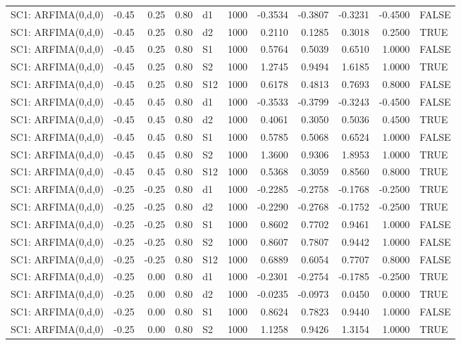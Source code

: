 \begin{table}[ht]
\begin{tabular}{lrrrlrrrrrl}
  SC1: ARFIMA(0,d,0) & -0.45 & 0.25 & 0.80 & d1 & 1000 & -0.3534 & -0.3807 & -0.3231 & -0.4500 & FALSE \\ 
  SC1: ARFIMA(0,d,0) & -0.45 & 0.25 & 0.80 & d2 & 1000 & 0.2110 & 0.1285 & 0.3018 & 0.2500 & TRUE \\ 
  SC1: ARFIMA(0,d,0) & -0.45 & 0.25 & 0.80 & S1 & 1000 & 0.5764 & 0.5039 & 0.6510 & 1.0000 & FALSE \\ 
  SC1: ARFIMA(0,d,0) & -0.45 & 0.25 & 0.80 & S2 & 1000 & 1.2745 & 0.9494 & 1.6185 & 1.0000 & TRUE \\ 
  SC1: ARFIMA(0,d,0) & -0.45 & 0.25 & 0.80 & S12 & 1000 & 0.6178 & 0.4813 & 0.7693 & 0.8000 & FALSE \\ 
  SC1: ARFIMA(0,d,0) & -0.45 & 0.45 & 0.80 & d1 & 1000 & -0.3533 & -0.3799 & -0.3243 & -0.4500 & FALSE \\ 
  SC1: ARFIMA(0,d,0) & -0.45 & 0.45 & 0.80 & d2 & 1000 & 0.4061 & 0.3050 & 0.5036 & 0.4500 & TRUE \\ 
  SC1: ARFIMA(0,d,0) & -0.45 & 0.45 & 0.80 & S1 & 1000 & 0.5785 & 0.5068 & 0.6524 & 1.0000 & FALSE \\ 
  SC1: ARFIMA(0,d,0) & -0.45 & 0.45 & 0.80 & S2 & 1000 & 1.3600 & 0.9306 & 1.8953 & 1.0000 & TRUE \\ 
  SC1: ARFIMA(0,d,0) & -0.45 & 0.45 & 0.80 & S12 & 1000 & 0.5368 & 0.3059 & 0.8560 & 0.8000 & TRUE \\ 
  SC1: ARFIMA(0,d,0) & -0.25 & -0.25 & 0.80 & d1 & 1000 & -0.2285 & -0.2758 & -0.1768 & -0.2500 & TRUE \\ 
  SC1: ARFIMA(0,d,0) & -0.25 & -0.25 & 0.80 & d2 & 1000 & -0.2290 & -0.2768 & -0.1752 & -0.2500 & TRUE \\ 
  SC1: ARFIMA(0,d,0) & -0.25 & -0.25 & 0.80 & S1 & 1000 & 0.8602 & 0.7702 & 0.9461 & 1.0000 & FALSE \\ 
  SC1: ARFIMA(0,d,0) & -0.25 & -0.25 & 0.80 & S2 & 1000 & 0.8607 & 0.7807 & 0.9442 & 1.0000 & FALSE \\ 
  SC1: ARFIMA(0,d,0) & -0.25 & -0.25 & 0.80 & S12 & 1000 & 0.6889 & 0.6054 & 0.7707 & 0.8000 & FALSE \\ 
  SC1: ARFIMA(0,d,0) & -0.25 & 0.00 & 0.80 & d1 & 1000 & -0.2301 & -0.2754 & -0.1785 & -0.2500 & TRUE \\ 
  SC1: ARFIMA(0,d,0) & -0.25 & 0.00 & 0.80 & d2 & 1000 & -0.0235 & -0.0973 & 0.0450 & 0.0000 & TRUE \\ 
  SC1: ARFIMA(0,d,0) & -0.25 & 0.00 & 0.80 & S1 & 1000 & 0.8624 & 0.7823 & 0.9440 & 1.0000 & FALSE \\ 
  SC1: ARFIMA(0,d,0) & -0.25 & 0.00 & 0.80 & S2 & 1000 & 1.1258 & 0.9426 & 1.3154 & 1.0000 & TRUE \\ 

\end{tabular}
\end{table}

